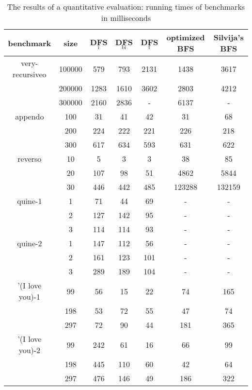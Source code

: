 \documentclass[format=acmlarge, review=true, authordraft=true]{acmart}
\begin{document}
\begin{table}
	\begin{tabular}{|c|c|c|c|c|c|c|}
		\hline 
		benchmark & size & DFS$_\textrm{i}$ & DFS$_\textrm{bi}$ & DFS$_\textrm{f}$ & optimized BFS & Silvija's BFS  
		\\
		\hline
		very-recursiveo & 100000 &  579 &  793 & 2131 & 1438 & 3617 \\
		& 200000 & 1283 & 1610 & 3602 & 2803 & 4212 \\
		& 300000 & 2160 & 2836 &    - & 6137 &    - \\
		\hline 
		appendo  & 100 &  31 &  41 &  42 &  31 &  68 \\ 
		& 200 & 224 & 222 & 221 & 226 & 218 \\ 
		& 300 & 617 & 634 & 593 & 631 & 622 \\ 
		\hline 
		reverso & 10 &   5 &   3 &   3 &     38 &     85 \\ 
		& 20 & 107 &  98 &  51 &   4862 &   5844 \\
		& 30 & 446 & 442 & 485 & 123288 & 132159 \\ 
		\hline
		quine-1 & 1 &  71 &  44 & 69 & - & - \\ 
		& 2 & 127 & 142 & 95 & - & - \\ 
		& 3 & 114 & 114 & 93 & - & - \\ 
		\hline
		quine-2 & 1 & 147 & 112 &  56 & - & - \\ 
		& 2 & 161 & 123 & 101 & - & - \\ 
		& 3 & 289 & 189 & 104 & - & - \\ 
		\hline 
		'(I love you)-1 &  99 & 56 & 15 & 22 &  74 & 165 \\ 
		& 198 & 53 & 72 & 55 &  47 &  74 \\
		& 297 & 72 & 90 & 44 & 181 & 365 \\ 
		\hline
		'(I love you)-2 &  99 & 242 &  61 & 16 &  66 &  99 \\ 
		& 198 & 445 & 110 & 60 &  42 &  64 \\
		& 297 & 476 & 146 & 49 & 186 & 322 \\ 
		\hline 
	\end{tabular}
	\caption{The results of a quantitative evaluation: running times of 
	benchmarks 
		in milliseconds}
	\label{compare-efficiency}
\end{table}
\end{document}
